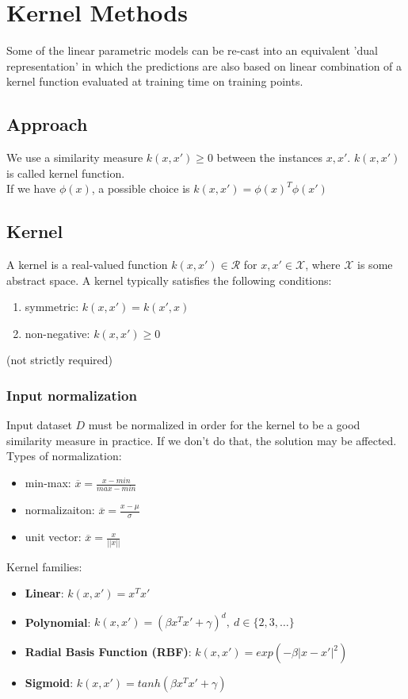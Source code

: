 \section{Kernel Methods}

Some of the linear parametric models can be re-cast into an equivalent 'dual representation' in which the predictions are also based on linear combination of a kernel function evaluated at training time on training points.

\subsection{Approach}
We use a similarity measure $k(x, x') \geq 0$ between the instances $x, x'$. $k(x, x')$ is called kernel function.\\ 
If we have $\phi(x)$, a possible choice is $k(x, x') = \phi(x)^{T}\phi(x')$

\subsection{Kernel}
A kernel is a real-valued function $k(x, x') \in \mathcal{R}$ for $x, x' \in \mathcal{X}$, where $\mathcal{X}$ is some abstract space. A kernel typically satisfies the following conditions:
\begin{enumerate}
    \item symmetric: $k(x, x') = k(x', x)$
    \item non-negative: $k(x, x') \geq 0$
\end{enumerate}
(not strictly required)

\subsubsection{Input normalization}
Input dataset $D$ must be normalized in order for the kernel to be a good similarity measure in practice. If we don't do that, the solution may be affected.\\
Types of normalization:
\begin{itemize}
    \item min-max:      $\overline{x} = \frac{x - min}{max - min}$
    \item normalizaiton:        $\overline{x} = \frac{x - \mu}{\sigma}$
    \item unit vector:      $\overline{x} = \frac{x}{||x||}$
\end{itemize}

Kernel families:
\begin{itemize}
    \item \textbf{Linear}: $k(x, x') = x^{T}x'$
    \item \textbf{Polynomial}: $k(x, x') = (\beta x^{T}x' + \gamma)^{d}, \ d \in \{2,3,\dots\}$
    \item \textbf{Radial Basis Function (RBF)}: $k(x, x') = exp(- \beta | x - x'|^{2})$
    \item \textbf{Sigmoid}: $k(x, x') = tanh(\beta x^{T}x' + \gamma)$
\end{itemize}

